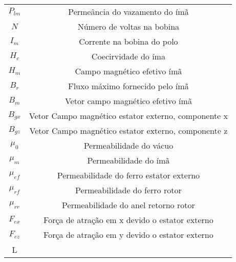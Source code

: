 \begin{tabular}{|c|c|}
	$P_{lm}$		& Permeância do vazamento do ímã	\\

	$N$				& Número de voltas na bobina \\
	$I_m$			& Corrente na bobina do polo \\	

	$H_c$			& Coecirvidade do íma \\
	$H_m$			& Campo magnético efetivo ímã \\

	$B_r$ 			& Fluxo máximo fornecido pelo ímã \\
	$B_m$			& Vetor campo magnético efetivo ímã \\
	$B_{gx}$		& Vetor Campo magnético estator externo, componente x \\
	$B_{gz}$		& Vetor Campo magnético estator externo, componente z \\

	$\mu_0$			& Permeabilidade do vácuo \\
	$\mu_m$			& Permeabilidade do ímã \\
	$\mu_{ef}$		& Permeabilidade do ferro estator externo \\
	$\mu_{rf}$		& Permeabilidade do ferro rotor \\
	$\mu_{rr}$		& Permeabilidade do anel retorno rotor\\

	$F_{ex}$		& Força de atração em x devido o estator externo \\
	$F_{ez}$		& Força de atração em y devido o estator externo \\
L

\end{tabular} 
